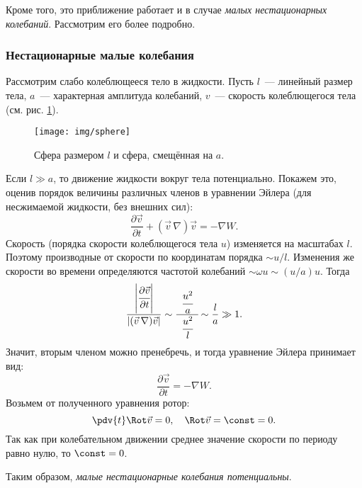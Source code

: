 Кроме того, это приближение работает и в случае \textit{малых нестационарных колебаний}. Рассмотрим его более подробно.


\subsubsection{Нестационарные малые колебания}
Рассмотрим слабо колеблющееся тело в жидкости. Пусть $l$~--- линейный размер тела, $a$~--- характерная амплитуда колебаний, $v$~--- скорость колеблющегося тела (см. рис. \ref{fig:sphere15}).
\begin{figure}[H]
	\centering
	\texttt{[image: img/sphere]}
	\caption{Сфера размером $l$ и сфера, смещённая на $a$.}
	\label{fig:sphere15}
\end{figure}
Если $l \gg a$, то движение жидкости вокруг тела потенциально. Покажем это, оценив порядок величины различных членов в уравнении Эйлера (для несжимаемой жидкости, без внешних сил):
\begin{equation}
\frac { \partial \vec{v} } { \partial t } + ( \vec{v}\,\nabla ) \vec{v} = - \nabla W.
\end{equation}
Скорость (порядка скорости колеблющегося тела $u$) изменяется на  масштабах $l$. Поэтому производные от скорости по координатам порядка $\sim u/l$. Изменения же скорости во времени определяются частотой колебаний $\sim \omega u \sim (u/a)u$. Тогда
\begin{equation}\begin{aligned}
\frac{
\left| \cfrac { \partial \vec{v} } { \partial t } \right|} {\left| (\vec{v}\,\nabla ) \vec{v} \right|} \sim \cfrac{\phantom{a}\cfrac { u^2 } { a }\phantom{a}} { \cfrac { u^2 }{ l } } \sim \frac { l } { a } \gg 1.
\end{aligned}\end{equation}
Значит, вторым членом можно пренебречь, и тогда уравнение Эйлера принимает вид:
\begin{equation}
\frac { \partial \vec{v} } { \partial t } = - \nabla W.
\end{equation}
Возьмем от полученного уравнения ротор:
\begin{equation}
\pdv{t}  \Rot  \vec{v} = 0 , \quad\Rot\vec{v} =  \const  = 0.
\end{equation}
Так как при колебательном движении среднее значение скорости по периоду равно нулю, то $\const=0$.

Таким образом, \textit{малые нестационарные колебания потенциальны}.

